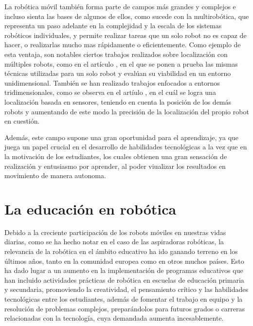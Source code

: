 La robótica móvil también forma parte de campos más grandes y complejos e
incluso sienta las bases de algunos de ellos, como sucede con la multirobótica,
que representa un paso adelante en la complejidad y la escala de los sistemas
robóticos individuales, y permite realizar tareas que un solo robot no es capaz
de hacer, o realizarlas mucho mas rápidamente o eficientemente.
Como ejemplo de esta ventaja, son notables ciertos trabajos realizados sobre
localización con múltiples robots, como en el artículo \cite{Trawny2009}, en el
que se ponen a prueba las mismas técnicas utilizadas para un solo robot y
evalúan su viabilidad en un entorno unidimensional.
También se han realizado trabajos enfocados a entornos tridimensionales, como se
observa en el artíulo \cite{Fox2000}, en el cuál se logra una localización
basada en sensores, teniendo en cuenta la posición de los demás robots y
aumentando de este modo la precisión de la localización del propio robot en
cuestión.

Además, este campo supone una gran oportunidad para el aprendizaje, ya que juega
un papel crucial en el desarrollo de habilidades tecnológicas a la vez que en la
motivación de los estudiantes, los cuales obtienen una gran sensación de
realización y entusiasmo por aprender, al poder viualizar los resultados en
movimiento de manera autonoma.



\section{La educación en robótica}
\label{sec:educacion_robotica} %

Debido a la creciente participación de los robots móviles en nuestras vidas
diarias, como se ha hecho notar en el caso de las aspiradoras robóticas, la
relevancia de la robótica en el ámbito educativo ha ido ganando terreno en los
últimos años, tanto en la comunidad europea como en otros muchos países.
Esto ha dado lugar a un aumento en la implementación de programas educativos que
han incluido actividades prácticas de robótica en escuelas de educación primaria
y secundaria, promoviendo la creatividad, el pensamiento crítico y las
habilidades tecnológicas entre los estudiantes, además de fomentar el trabajo en
equipo y la resolución de problemas complejos, preparándolos para futuros grados
o carreras relacionadas con la tecnología, cuya demandada aumenta
incesablemente.

